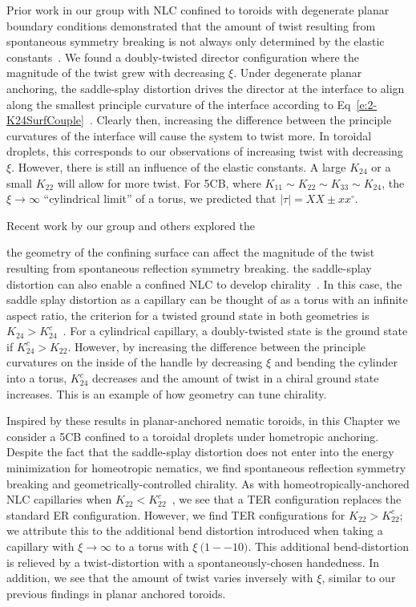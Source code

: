 Prior work in our group with NLC confined to toroids with degenerate planar boundary conditions demonstrated that the amount of twist resulting from spontaneous symmetry breaking is not always only determined by the elastic constants~\cite{RN46}.
We found a doubly-twisted director configuration where the magnitude of the twist grew with decreasing $\xi$.
Under degenerate planar anchoring, the saddle-splay distortion drives the director at the interface to align along the smallest principle curvature of the interface according to Eq~\ref{e:2-K24SurfCouple}~\cite{RN59}.
Clearly then, increasing the difference between the principle curvatures of the interface will cause the system to twist more.
In toroidal droplets, this corresponds to our observations of increasing twist with decreasing $\xi$.
However, there is still an influence of the elastic constants.
A large $K_{24}$ or a small $K_{22}$ will allow for more twist.
For 5CB, where $K_{11}\sim K_{22} \sim K_{33} \sim K_{24}$, the $\xi \rightarrow \infty $ ``cylindrical limit'' of a torus, we predicted that $|\tau| = XX \pm xx^{\circ}$.

Recent work by our group and others explored the 

 the geometry of the confining surface can affect the magnitude of the twist resulting from spontaneous reflection symmetry breaking. the saddle-splay distortion can also enable a confined NLC to develop chirality~\cite{RN46,RN59,RN293}.
In this case, the saddle splay distortion  as a capillary can be thought of as a torus with an infinite aspect ratio, the criterion for a twisted ground state in both geometries is $K_{24} > K^c_{24}$~\cite{RN24,RN293}.
For a cylindrical capillary, a doubly-twisted state is the ground state if $K^c_{24}>K_{22}$.
However, by increasing the difference between the principle curvatures on the inside of the handle by decreasing $\xi$ and bending the cylinder into a torus, $K^c_{24}$ decreases and the amount of twist in a chiral ground state increases.
This is an example of how geometry can tune chirality.

Inspired by these results in planar-anchored nematic toroids, in this Chapter we consider a 5CB confined to a toroidal droplets under hometropic anchoring.
Despite the fact that the saddle-splay distortion does not enter into the energy minimization for homeotropic nematics, we find spontaneous reflection symmetry breaking and geometrically-controlled chirality.
As with homeotropically-anchored NLC capillaries when $K_{22} < K^c_{22}$~\cite{RN192}, we see that a TER configuration replaces the standard ER configuration.
However, we find TER configurations for $K_{22} > K^c_{22}$; we attribute this to the additional bend distortion introduced when taking a capillary with $\xi \rightarrow \infty$ to a torus with $\xi ~\mathcal(1--10)$.
This additional bend-distortion is relieved by a twist-distortion with a spontaneously-chosen handedness.
In addition, we see that the amount of twist varies inversely with $\xi$, similar to our previous findings in planar anchored toroids.




